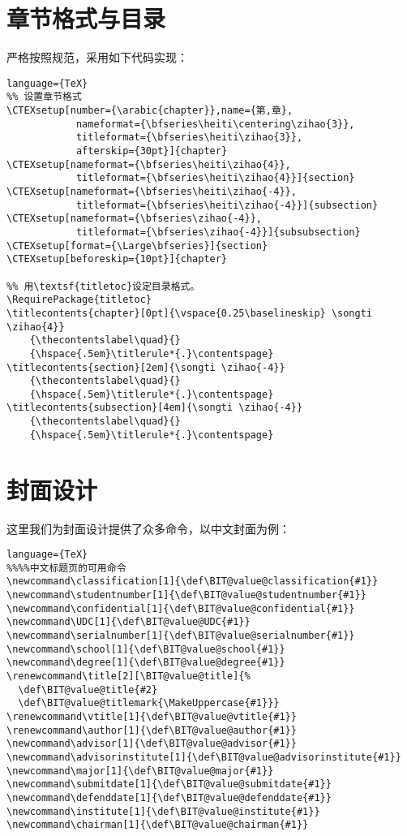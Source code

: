 \section{章节格式与目录}
严格按照规范，采用如下代码实现：
\begin{lstlisting}language={TeX}
%% 设置章节格式
\CTEXsetup[number={\arabic{chapter}},name={第,章},
            nameformat={\bfseries\heiti\centering\zihao{3}},
            titleformat={\bfseries\heiti\zihao{3}},
            afterskip={30pt}]{chapter}
\CTEXsetup[nameformat={\bfseries\heiti\zihao{4}},
            titleformat={\bfseries\heiti\zihao{4}}]{section}
\CTEXsetup[nameformat={\bfseries\heiti\zihao{-4}},
            titleformat={\bfseries\heiti\zihao{-4}}]{subsection}
\CTEXsetup[nameformat={\bfseries\zihao{-4}},
            titleformat={\bfseries\zihao{-4}}]{subsubsection}
\CTEXsetup[format={\Large\bfseries}]{section}
\CTEXsetup[beforeskip={10pt}]{chapter}

%% 用\textsf{titletoc}设定目录格式。
\RequirePackage{titletoc}
\titlecontents{chapter}[0pt]{\vspace{0.25\baselineskip} \songti \zihao{4}}
    {\thecontentslabel\quad}{}
    {\hspace{.5em}\titlerule*{.}\contentspage}
\titlecontents{section}[2em]{\songti \zihao{-4}}
    {\thecontentslabel\quad}{}
    {\hspace{.5em}\titlerule*{.}\contentspage}
\titlecontents{subsection}[4em]{\songti \zihao{-4}}
    {\thecontentslabel\quad}{}
    {\hspace{.5em}\titlerule*{.}\contentspage}
\end{lstlisting}

\section{封面设计}
这里我们为封面设计提供了众多命令，以中文封面为例：
\begin{lstlisting}language={TeX}
%%%%中文标题页的可用命令
\newcommand\classification[1]{\def\BIT@value@classification{#1}}
\newcommand\studentnumber[1]{\def\BIT@value@studentnumber{#1}}
\newcommand\confidential[1]{\def\BIT@value@confidential{#1}}
\newcommand\UDC[1]{\def\BIT@value@UDC{#1}}
\newcommand\serialnumber[1]{\def\BIT@value@serialnumber{#1}}
\newcommand\school[1]{\def\BIT@value@school{#1}}
\newcommand\degree[1]{\def\BIT@value@degree{#1}}
\renewcommand\title[2][\BIT@value@title]{%
  \def\BIT@value@title{#2}
  \def\BIT@value@titlemark{\MakeUppercase{#1}}}
\renewcommand\vtitle[1]{\def\BIT@value@vtitle{#1}}
\renewcommand\author[1]{\def\BIT@value@author{#1}}
\newcommand\advisor[1]{\def\BIT@value@advisor{#1}}
\newcommand\advisorinstitute[1]{\def\BIT@value@advisorinstitute{#1}}
\newcommand\major[1]{\def\BIT@value@major{#1}}
\newcommand\submitdate[1]{\def\BIT@value@submitdate{#1}}
\newcommand\defenddate[1]{\def\BIT@value@defenddate{#1}}
\newcommand\institute[1]{\def\BIT@value@institute{#1}}
\newcommand\chairman[1]{\def\BIT@value@chairman{#1}}
\end{lstlisting}

